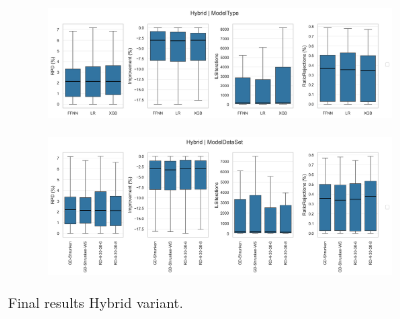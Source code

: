 \begin{figure}[!ht]
	\centering
	\begin{subfigure}[t]{\textwidth}
		\centering
		\includegraphics[width=0.9\linewidth]{pictures/final_results/ModelType_Hybrid_boxplot_final_results.png}
	\end{subfigure}
	\begin{subfigure}[t]{\textwidth}
		\centering
		\includegraphics[width=0.9\linewidth]{pictures/final_results/ModelDataSet_Hybrid_boxplot_final_results.png}
	\end{subfigure}
	\caption{Final results Hybrid variant.}
	\label{fig:final_results_hybrid_variant}
\end{figure}


